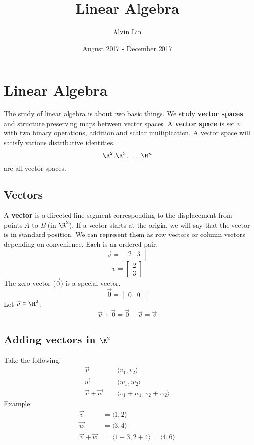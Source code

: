 \documentclass[letterpaper, 12pt]{math}
\title{Linear Algebra}
\author{Alvin Lin}
\date{August 2017 - December 2017}
\begin{document}
\maketitle

\section*{Linear Algebra}
The study of linear algebra is about two basic things. We study
\textbf{vector spaces} and structure preserving maps between vector
spaces. A \textbf{vector space} is set \( v \) with two binary operations,
addition and scalar multiplcation. A vector space will satisfy various
distributive identities.
\[ \R^{2}, \R^{3}, \dots, \R^{n} \]
are all vector spaces.

\subsection*{Vectors}
A \textbf{vector} is a directed line segment corresponding to the displacement
from points \( A \) to \( B \) (in \( \R^{2} \)). If a vector starts at the
origin, we will say that the vector is in standard position. We can represent
them as row vectors or column vectors depending on convenience. Each is an
ordered pair.
\[ \vec{v} =
  \begin{bmatrix}
    2 & 3 \\
  \end{bmatrix} \]
\[ \vec{v} =
  \begin{bmatrix}
    2 \\
    3
  \end{bmatrix}
\]
The zero vector (\( \vec{0} \)) is a special vector.
\[ \vec{0} =
  \begin{bmatrix}
    0 & 0
  \end{bmatrix}
\]
Let \( \vec{v}\in\R^{2} \):
\[ \vec{v}+\vec{0}=\vec{0}+\vec{v}=\vec{v} \]

\subsection*{Adding vectors in \( \R^{2} \)}
Take the following:
\begin{align*}
  \vec{v} &= \langle v_{1},v_{2}\rangle \\
  \vec{w} &= \langle w_{1},w_{2}\rangle \\
  \vec{v}+\vec{w} &= \langle v_{1}+w_{1},v_{2}+w_{2}\rangle
\end{align*}
Example:
\begin{align*}
  \vec{v} &= \langle1,2\rangle \\
  \vec{w} &= \langle3,4\rangle \\
  \vec{v}+\vec{w} &= \langle1+3,2+4\rangle = \langle4,6\rangle
\end{align*}
\end{document}
